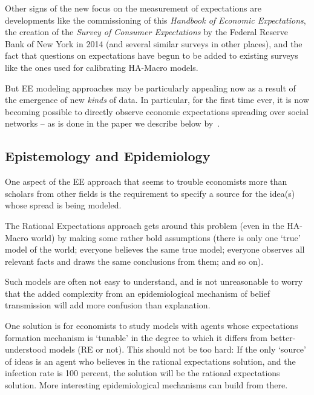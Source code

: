     Other signs of the new focus on the measurement of expectations are developments like the commissioning of this \emph{Handbook of Economic Expectations}, the creation of the \emph{Survey of Consumer Expectations} by the Federal Reserve Bank of New York in 2014 %
    (and several similar surveys in other places), and the fact that questions on expectations have begun to be added to existing surveys like the ones used for calibrating HA-Macro models.  %

    But EE modeling approaches may be particularly appealing now as a result of the emergence of new \emph{kinds} of data.  In particular, for the first time ever, it is now becoming possible to directly observe economic expectations spreading over social networks -- as is done in the paper we describe below by~\cite{bailey2018economic}.

\subsection{Epistemology and Epidemiology}

    One aspect of the EE approach that seems to trouble economists more than scholars from other fields is the requirement to specify a source for the idea(s) whose spread is being modeled.

    The Rational Expectations approach gets around this problem (even in the HA-Macro world) by making some rather bold assumptions (there is only one `true' model of the world; everyone believes the same true model; everyone observes all relevant facts and draws the same conclusions from them; and so on).  %

    Such models are often not easy to understand, and is not unreasonable to worry that the added complexity from an epidemiological mechanism of belief transmission will add more confusion than explanation.

    One solution is for economists to study models with agents whose expectations formation mechanism is `tunable' in the degree to which it differs from better-understood models (RE or not).  This should not be too hard:  If the only `source' of ideas is an agent who believes in the rational expectations solution, and the infection rate is 100 percent, the solution will be the rational expectations solution.  More interesting epidemiological mechanisms can build from there.

